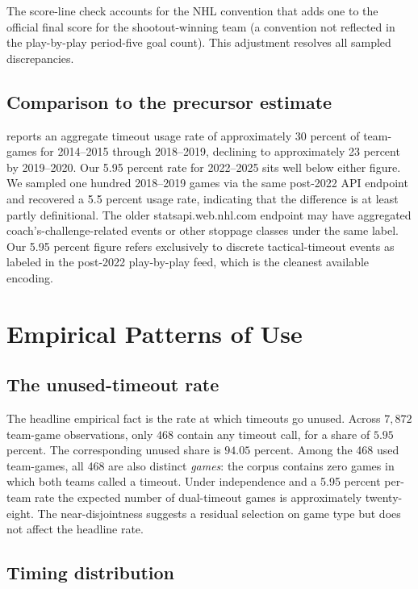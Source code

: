 \documentclass[11pt]{article}
\begin{document}
The score-line check accounts for the NHL convention that adds one to the official final score for the shootout-winning team (a convention not reflected in the play-by-play period-five goal count). This adjustment resolves all sampled discrepancies.

\subsection{Comparison to the precursor estimate}

\citet{Ferer2020} reports an aggregate timeout usage rate of approximately 30 percent of team-games for 2014--2015 through 2018--2019, declining to approximately 23 percent by 2019--2020. Our 5.95 percent rate for 2022--2025 sits well below either figure. We sampled one hundred 2018--2019 games via the same post-2022 API endpoint and recovered a 5.5 percent usage rate, indicating that the difference is at least partly definitional. The older statsapi.web.nhl.com endpoint may have aggregated coach's-challenge-related events or other stoppage classes under the same label. Our 5.95 percent figure refers exclusively to discrete tactical-timeout events as labeled in the post-2022 play-by-play feed, which is the cleanest available encoding.

\section{Empirical Patterns of Use}\label{sec:empirics}

\subsection{The unused-timeout rate}

The headline empirical fact is the rate at which timeouts go unused. Across $7{,}872$ team-game observations, only $468$ contain any timeout call, for a share of $5.95$ percent. The corresponding unused share is $\mathbf{94.05}$ percent. Among the 468 used team-games, all 468 are also distinct \emph{games}: the corpus contains zero games in which both teams called a timeout. Under independence and a 5.95 percent per-team rate the expected number of dual-timeout games is approximately twenty-eight. The near-disjointness suggests a residual selection on game type but does not affect the headline rate.

\subsection{Timing distribution}
\end{document}
